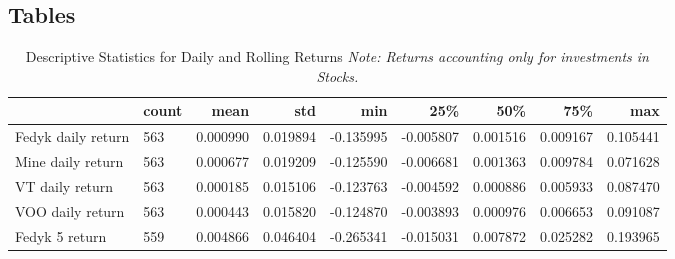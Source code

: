 \begin{appendices}
\section{Tables}


\begin{table}[ht]
\centering
\caption{Descriptive Statistics for Daily and Rolling Returns
\newline \footnotesize{\textit{Note: Returns accounting only for investments in Stocks.}}}
\begin{adjustbox}{width=\textwidth}
    \begin{tabular}{@{}lllllllll@{}}
    \toprule
    \multicolumn{1}{r}{\textbf{}}       & \multicolumn{1}{r}{\textbf{count}} & \multicolumn{1}{r}{\textbf{mean}} & \multicolumn{1}{r}{\textbf{std}} & \multicolumn{1}{r}{\textbf{min}} & \multicolumn{1}{r}{\textbf{25\%}} & \multicolumn{1}{r}{\textbf{50\%}} & \multicolumn{1}{r}{\textbf{75\%}} & \multicolumn{1}{r}{\textbf{max}} \\ \midrule
    Fedyk daily return  & 563                                & 0.000990                          & 0.019894                         & -0.135995                        & -0.005807                         & 0.001516                          & 0.009167                          & 0.105441                         \\
    Mine daily return   & 563                                & 0.000677                          & 0.019209                         & -0.125590                        & -0.006681                         & 0.001363                          & 0.009784                          & 0.071628                         \\
    VT daily return             & 563                               & 0.000185                           & 0.015106                         & -0.123763                        & -0.004592                         & 0.000886                          & 0.005933                          & 0.087470                         \\
    VOO daily return            & 563                               & 0.000443                           & 0.015820                         & -0.124870                        & -0.003893                         & 0.000976                          & 0.006653                          & 0.091087                         \\
    Fedyk 5 return       & 559                                & 0.004866                          & 0.046404                         & -0.265341                        & -0.015031                         & 0.007872                          & 0.025282                          & 0.193965                         \\

\end{tabular}
\end{adjustbox}
\end{table}
\end{appendices}
